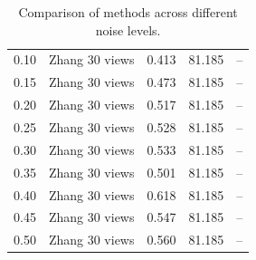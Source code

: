 \begin{table}[H]
\begin{tabular}{l c l l l}
0.10 & Zhang 30 views & 0.413 & 81.185 & -- \\
0.15 & Zhang 30 views & 0.473 & 81.185 & -- \\
0.20 & Zhang 30 views & 0.517 & 81.185 & -- \\
0.25 & Zhang 30 views & 0.528 & 81.185 & -- \\
0.30 & Zhang 30 views & 0.533 & 81.185 & -- \\
0.35 & Zhang 30 views & 0.501 & 81.185 & -- \\
0.40 & Zhang 30 views & 0.618 & 81.185 & -- \\
0.45 & Zhang 30 views & 0.547 & 81.185 & -- \\
0.50 & Zhang 30 views & 0.560 & 81.185 & -- \\
\midrule
\bottomrule
\end{tabular}
\label{tab:SyntheticNoise}
\caption{Comparison of methods across different noise levels.}
\end{table}

